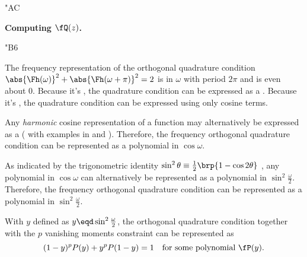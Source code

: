 \begin{dingautolist}{"AC}
  \item \textbf{Computing $\fQ(z)$.}
    \begin{dingautolist}{"B6}

      \item The frequency representation of the orthogonal quadrature condition
            $\abs{\Fh(\omega)}^2  + \abs{\Fh(\omega+\pi)}^2 = 2$
             is  in $\omega$ with
            period $2\pi$ and is even about $0$.
            Because it's , the quadrature condition can be expressed
            as a  .
            Because it's , the quadrature condition can be expressed
            using only cosine terms.

      \item Any \emph{harmonic} cosine representation of a function may alternatively be
            expressed as a 
            ( with examples in  and ).
            Therefore, the frequency orthogonal quadrature condition can be represented
            as a polynomial in $\cos\omega$.

      \item As indicated by the trigonometric identity
            $\sin^2\theta\equiv\frac{1}{2}\brp{1-\cos2\theta}$
            ,
            any polynomial in $\cos\omega$ can alternatively be represented as
            a polynomial in $\sin^2\frac{\omega}{2}$.
            Therefore, the frequency orthogonal quadrature condition can be represented
            as a polynomial in $\sin^2\frac{\omega}{2}$.

      \item With $y$ defined as $y\eqd\sin^2\frac{\omega}{2}$,
            the orthogonal quadrature condition together with the $p$ vanishing moments
            constraint can be represented as 
            \[(1-y)^p P(y) + y^p P(1-y) = 1 \quad \text{for some polynomial $\fP(y)$}.\]


\end{dingautolist}
\end{dingautolist}
